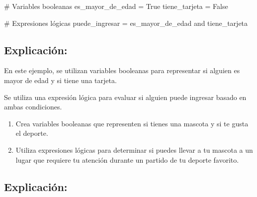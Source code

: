 \documentclass[
  a4paper,
  DIV=11,
  numbers=noendperiod,
  onepage,
  openany]{scrreprt}
\newenvironment{Shaded}{\begin{snugshade}}{\end{snugshade}}
\newcommand{\CommentTok}[1]{\textcolor[rgb]{0.37,0.37,0.37}{#1}}
\newcommand{\KeywordTok}[1]{\textcolor[rgb]{0.00,0.23,0.31}{#1}}
\newcommand{\NormalTok}[1]{\textcolor[rgb]{0.00,0.23,0.31}{#1}}
\newcommand{\OperatorTok}[1]{\textcolor[rgb]{0.37,0.37,0.37}{#1}}
\newcommand{\VariableTok}[1]{\textcolor[rgb]{0.07,0.07,0.07}{#1}}
\providecommand{\tightlist}{%
  \setlength{\itemsep}{0pt}\setlength{\parskip}{0pt}}\usepackage{longtable,booktabs,array}
\begin{document}
\begin{Shaded}
\begin{Highlighting}[]
\CommentTok{\# Variables booleanas}
\NormalTok{es\_mayor\_de\_edad }\OperatorTok{=} \VariableTok{True}
\NormalTok{tiene\_tarjeta }\OperatorTok{=} \VariableTok{False}

\CommentTok{\# Expresiones lógicas}
\NormalTok{puede\_ingresar }\OperatorTok{=}\NormalTok{ es\_mayor\_de\_edad }\KeywordTok{and}\NormalTok{ tiene\_tarjeta}
\end{Highlighting}
\end{Shaded}

\subsection{Explicación:}\label{explicaciuxf3n-12}

En este ejemplo, se utilizan variables booleanas para representar si
alguien es mayor de edad y si tiene una tarjeta.

Se utiliza una expresión lógica para evaluar si alguien puede ingresar
basado en ambas condiciones.

\begin{tcolorbox}[enhanced jigsaw, leftrule=.75mm, bottomtitle=1mm, title=\textcolor{quarto-callout-tip-color}{\faLightbulb}\hspace{0.5em}{Actividad Práctica}, colbacktitle=quarto-callout-tip-color!10!white, coltitle=black, bottomrule=.15mm, colframe=quarto-callout-tip-color-frame, titlerule=0mm, opacityback=0, rightrule=.15mm, toptitle=1mm, opacitybacktitle=0.6, arc=.35mm, breakable, colback=white, toprule=.15mm, left=2mm]

\begin{enumerate}
\def\labelenumi{\arabic{enumi}.}
\tightlist
\item
  Crea variables booleanas que representen si tienes una mascota y si te
  gusta el deporte.
\item
  Utiliza expresiones lógicas para determinar si puedes llevar a tu
  mascota a un lugar que requiere tu atención durante un partido de tu
  deporte favorito.
\end{enumerate}

\end{tcolorbox}

\subsection{Explicación:}\label{explicaciuxf3n-13}
\end{document}

